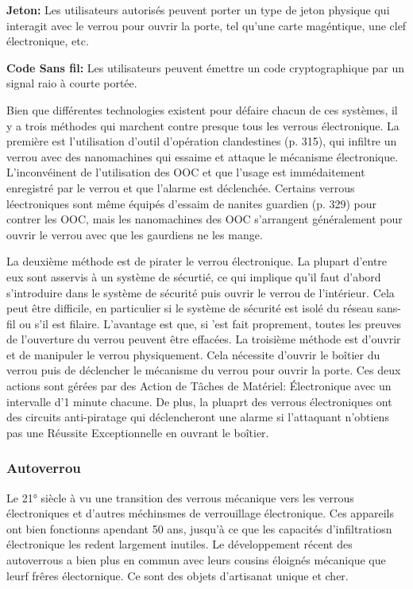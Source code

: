 \textbf{Jeton:} Les utilisateurs autorisés peuvent porter un type de jeton physique qui interagit avec le verrou pour ouvrir la porte, tel qu'une carte magéntique, une clef électronique, etc. 

\textbf{Code Sans fil:} Les utilisateurs peuvent émettre un code cryptographique par un signal raio à courte portée. 

Bien que différentes technologies existent pour défaire chacun de ces systèmes, il y a trois méthodes qui marchent contre presque tous les verrous électronique. La première est l'utilisation d'outil d'opération clandestines (p. 315), qui infiltre un verrou avec des nanomachines qui essaime et attaque le mécanisme électronique. L'inconvéinent de l'utilisation des OOC et que l'usage est immédaitement enregistré par le verrou et que l'alarme est déclenchée. Certains verrous léectroniques sont même équipés d'essaim de nanites guardien (p. 329) pour contrer les OOC, mais les nanomachines des OOC s'arrangent généralement pour ouvrir le verrou avec que les gaurdiens ne les mange. 

La deuxième méthode est de pirater le verrou électronique. La plupart d'entre eux sont asservis à un système de sécurtié, ce qui implique qu'il faut d'abord s'introduire dans le système de sécurité puis ouvrir le verrou de l'intérieur. Cela peut être difficile, en particulier si le système de sécurité est isolé du réseau sans-fil ou s'il est filaire. L'avantage est que, si 'est fait proprement, toutes les preuves de l'ouverture du verrou peuvent être effacées. La troisième méthode est d'ouvrir et de manipuler le verrou physiquement. Cela nécessite d'ouvrir le boîtier du verrou puis de déclencher le mécanisme du verrou pour ouvrir la porte. Ces deux actions sont gérées par des Action de Tâches de Matériel: Électronique avec un intervalle d'1 minute chacune. De plus, la pluaprt des verrous électroniques ont des circuits anti-piratage qui déclencheront une alarme si l'attaquant n'obtiens pas une Réussite Exceptionnelle en ouvrant le boîtier. 

\subsubsection{Autoverrou} 

Le 21° siècle à vu une transition des verrous mécanique vers les verrous électroniques et d'autres méchinsmes de verrouillage électronique. Ces appareils ont bien fonctionns apendant 50 ans, jusqu'à ce que les capacités d'infiltratiosn électronique les redent largement inutiles. Le développement récent des autoverrous a bien plus en commun avec leurs cousins éloignés mécanique que leurf frêres électornique. Ce sont des objets d'artisanat unique et cher. 

